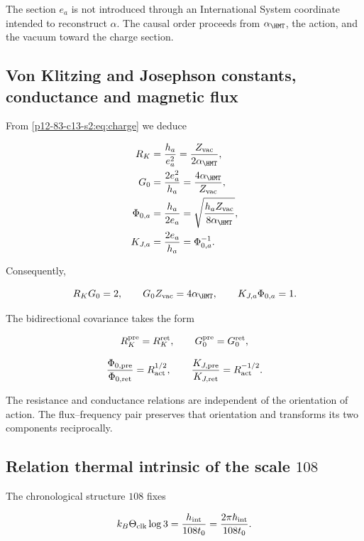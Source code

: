 The section \(e_a\) is not introduced through an International System
coordinate intended to reconstruct \(\alpha\). The causal order proceeds from
\(\alpha_{\HMT}\), the action, and the vacuum toward the charge section.

\subsection{Von Klitzing and Josephson constants, conductance and magnetic flux}

From \cref{p12-83-c13-s2:eq:charge} we deduce

\begin{align}
R_K&=\frac{h_a}{e_a^2}=\frac{Z_{\rm vac}}{2\alpha_{\HMT}},
\label{p12-83-c13-s2:eq:rk}\\
G_0&=\frac{2e_a^2}{h_a}=\frac{4\alpha_{\HMT}}{Z_{\rm vac}},
\label{p12-83-c13-s2:eq:g0}\\
\Phi_{0,a}&=\frac{h_a}{2e_a}
=\sqrt{\frac{h_aZ_{\rm vac}}{8\alpha_{\HMT}}},
\label{p12-83-c13-s2:eq:phi0}\\
K_{J,a}&=\frac{2e_a}{h_a}=\Phi_{0,a}^{-1}.
\label{p12-83-c13-s2:eq:kj}
\end{align}

Consequently,

\begin{equation}
R_KG_0=2,\qquad G_0Z_{\rm vac}=4\alpha_{\HMT},
\qquad K_{J,a}\Phi_{0,a}=1.
\label{p12-83-c13-s2:eq:quantum-electrical-identities}
\end{equation}

The bidirectional covariance takes the form

\[
R_K^{\rm pre}=R_K^{\rm ret},\qquad
G_0^{\rm pre}=G_0^{\rm ret},
\]

\[
\frac{\Phi_{0,\rm pre}}{\Phi_{0,\rm ret}}=R_{\rm act}^{1/2},
\qquad
\frac{K_{J,\rm pre}}{K_{J,\rm ret}}=R_{\rm act}^{-1/2}.
\]

The resistance and conductance relations are independent of the
orientation of action. The flux--frequency pair preserves that
orientation and transforms its two components reciprocally.

\subsection{Relation thermal intrinsic of the scale \texorpdfstring{\(108\)}{108}}

The chronological structure \(108\) fixes

\begin{equation}
k_B\Theta_{\rm clk}\log3
=\frac{h_{\rm int}}{108t_0}
=\frac{2\pi\hbar_{\rm int}}{108t_0}.
\label{p12-83-c13-s2:eq:boltzmann-clock}
\end{equation}

